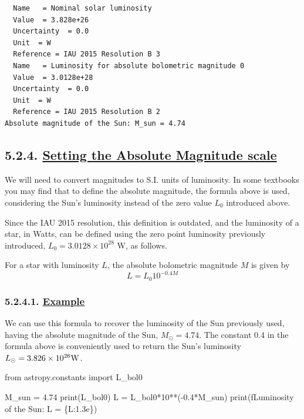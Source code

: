 \documentclass[
  letterpaper,
  DIV=11,
  numbers=noendperiod]{scrreprt}
\newenvironment{Shaded}{\begin{snugshade}}{\end{snugshade}}
\newcommand{\BuiltInTok}[1]{\textcolor[rgb]{0.00,0.23,0.31}{#1}}
\newcommand{\DecValTok}[1]{\textcolor[rgb]{0.68,0.00,0.00}{#1}}
\newcommand{\FloatTok}[1]{\textcolor[rgb]{0.68,0.00,0.00}{#1}}
\newcommand{\ImportTok}[1]{\textcolor[rgb]{0.00,0.46,0.62}{#1}}
\newcommand{\NormalTok}[1]{\textcolor[rgb]{0.00,0.23,0.31}{#1}}
\newcommand{\OperatorTok}[1]{\textcolor[rgb]{0.37,0.37,0.37}{#1}}
\newcommand{\SpecialCharTok}[1]{\textcolor[rgb]{0.37,0.37,0.37}{#1}}
\newcommand{\SpecialStringTok}[1]{\textcolor[rgb]{0.13,0.47,0.30}{#1}}
\begin{document}
\begin{verbatim}
  Name   = Nominal solar luminosity
  Value  = 3.828e+26
  Uncertainty  = 0.0
  Unit  = W
  Reference = IAU 2015 Resolution B 3
  Name   = Luminosity for absolute bolometric magnitude 0
  Value  = 3.0128e+28
  Uncertainty  = 0.0
  Unit  = W
  Reference = IAU 2015 Resolution B 2
Absolute magnitude of the Sun: M_sun = 4.74
\end{verbatim}

\hypertarget{setting-the-absolute-magnitude-scale}{%
\subsection{\texorpdfstring{5.2.4. \protect\hyperlink{toc0_}{Setting the
Absolute Magnitude
scale}}{5.2.4. Setting the Absolute Magnitude scale}}\label{setting-the-absolute-magnitude-scale}}

We will need to convert magnitudes to S.I. units of luminosity. In some
textbooks you may find that to define the absolute magnitude, the
formula above is used, considering the Sun's luminosity instead of the
zero value \(L_0\) introduced above.

Since the IAU 2015 resolution, this definition is outdated, and the
luminosity of a star, in Watts, can be defined using the zero point
luminosity previously introduced, \(L_0=3.0128\times 10^{28}\) W, as
follows.

For a star with luminosity \(L\), the absolute bolometric magnitude
\(M\) is given by \begin{equation}
L = L_0 10^{-0.4 M}
\end{equation}

\hypertarget{example}{%
\subsubsection{\texorpdfstring{5.2.4.1.
\protect\hyperlink{toc0_}{Example}}{5.2.4.1. Example}}\label{example}}

We can use this formula to recover the luminosity of the Sun previously
used, having the absolute magnitude of the Sun, \(M_\odot = 4.74\). The
constant 0.4 in the formula above is conveniently used to return the
Sun's luminosity \(L_\odot = 3.826 \times 10^{26}\rm{W}\).

\begin{Shaded}
\begin{Highlighting}[]
\ImportTok{from}\NormalTok{ astropy.constants }\ImportTok{import}\NormalTok{ L\_bol0}

\NormalTok{M\_sun }\OperatorTok{=} \FloatTok{4.74}
\BuiltInTok{print}\NormalTok{(L\_bol0)}
\NormalTok{L }\OperatorTok{=}\NormalTok{ L\_bol0}\OperatorTok{*}\DecValTok{10}\OperatorTok{**}\NormalTok{(}\OperatorTok{{-}}\FloatTok{0.4}\OperatorTok{*}\NormalTok{M\_sun)}
\BuiltInTok{print}\NormalTok{(}\SpecialStringTok{f\textquotesingle{}Luminosity of the Sun: L = }\SpecialCharTok{\{}\NormalTok{L}\SpecialCharTok{:1.3e\}}\SpecialStringTok{\textquotesingle{}}\NormalTok{)}
\end{Highlighting}
\end{Shaded}
\end{document}

